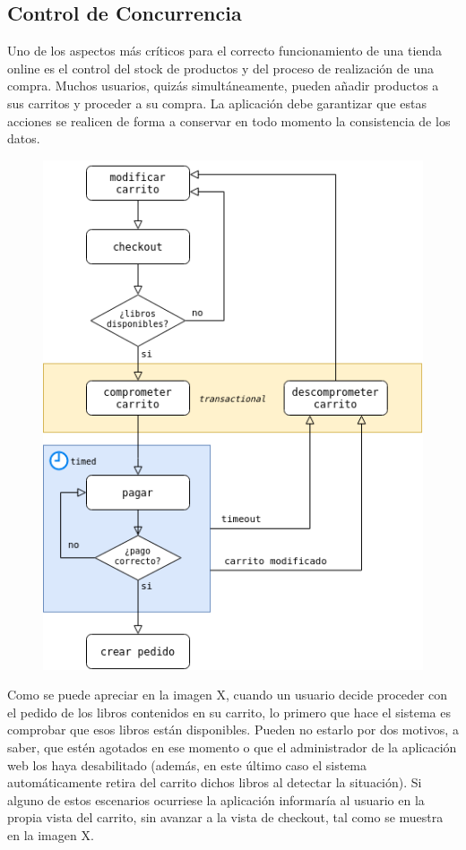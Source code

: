 \documentclass[a4paper]{report}
\begin{document}
    \subsection{Control de Concurrencia}
    Uno de los aspectos más críticos para el correcto funcionamiento de una tienda online es el control del stock de productos y del proceso de realización de una compra. Muchos usuarios, quizás simultáneamente, pueden añadir productos a sus carritos y proceder a su compra. La aplicación debe garantizar que estas acciones se realicen de forma a conservar en todo momento la consistencia de los datos.
    \\
    
    \begin{figure}[hbt!]
    	\centering
    	\includegraphics[width=\textwidth]{cart_diagram}
    \end{figure}
    
    Como se puede apreciar en la imagen X, cuando un usuario decide proceder con el pedido de los libros contenidos en su carrito, lo primero que hace el sistema es comprobar que esos libros están disponibles. Pueden no estarlo por dos motivos, a saber, que estén agotados en ese momento o que el administrador de la aplicación web los haya desabilitado (además, en este último caso el sistema automáticamente retira del carrito dichos libros al detectar la situación). Si alguno de estos escenarios ocurriese la aplicación informaría al usuario en la propia vista del carrito, sin avanzar a la vista de checkout, tal como se muestra en la imagen X.
    \\
    
\end{document}
